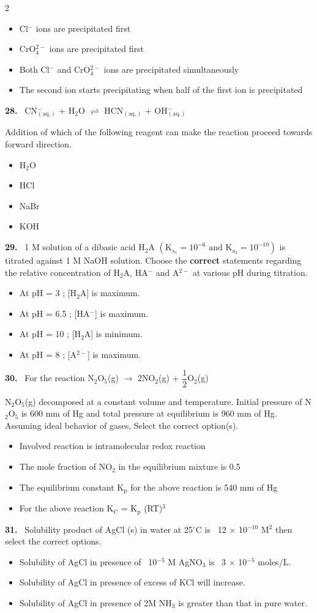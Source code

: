 \documentclass[10pt]{extarticle}
\newcommand{\qn}[1]{\par\smallskip\noindent\textbf{#1.}~}
\newenvironment{qoptions}{\begin{itemize}[leftmargin=1.8em,itemsep=1pt,topsep=2pt,label={}]}{\end{itemize}}
\newcommand{\opt}[2]{\item[(#1)] #2}
\begin{document}
\begin{multicols}{2}
\begin{qoptions}
\opt{A}{Cl$^-$ ions are precipitated first}
\opt{B}{CrO$_4^{2-}$ ions are precipitated first}
\opt{C}{Both Cl$^-$ and CrO$_4^{2-}$ ions are precipitated simultaneously}
\opt{D}{The second ion starts precipitating when half of the first ion is precipitated}
\end{qoptions}
\qn{28} CN$^-_{\mathrm{(aq.)}}$ + H$_2$O $\rightleftharpoons$ HCN$_{\mathrm{(aq.)}}$ + OH$^-_{\mathrm{(aq.)}}$\par
Addition of which of the following reagent can make the reaction proceed towards forward direction.
\begin{qoptions}
\opt{A}{H$_2$O}
\opt{B}{HCl}
\opt{C}{NaBr}
\opt{D}{KOH}
\end{qoptions}
\qn{29} 1 M solution of a dibasic acid H$_2$A $\left(\mathrm K_{\mathrm a_1}=10^{-6}\text{ and }\mathrm K_{\mathrm a_2}=10^{-10}\right)$ is titrated against 1 M NaOH solution. Choose the \textbf{correct} statements regarding the relative concentration of H$_2$A, HA$^-$ and A$^{2-}$ at various pH during titration.
\begin{qoptions}
\opt{A}{At pH = 3 ; [H$_2$A] is maximum.}
\opt{B}{At pH = 6.5 ; [HA$^-$] is maximum.}
\opt{C}{At pH = 10 ; [H$_2$A] is minimum.}
\opt{D}{At pH = 8 ; [A$^{2-}$] is maximum.}
\end{qoptions}
\qn{30} For the reaction N$_2$O$_5$(g) $\longrightarrow$ 2NO$_2$(g) + $\dfrac12$O$_2$(g)\par
N$_2$O$_5$(g) decomposed at a constant volume and temperature. Initial pressure of N$_2$O$_5$ is 600 mm of Hg and total pressure at equilibrium is 960 mm of Hg. Assuming ideal behavior of gases, Select the correct option(s).
\begin{qoptions}
\opt{A}{Involved reaction is intramolecular redox reaction}
\opt{B}{The mole fraction of NO$_2$ in the equilibrium mixture is 0.5}
\opt{C}{The equilibrium constant K$_\mathrm p$ for the above reaction is 540 mm of Hg}
\opt{D}{For the above reaction K$_\mathrm C$ = K$_\mathrm p$ (RT)$^3$}
\end{qoptions}
\qn{31} Solubility product of AgCl (s) in water at 25$^\circ$C is \ 12 $\times$ 10$^{-10}$ M$^2$ then select the correct options.
\begin{qoptions}
\opt{A}{Solubility of AgCl in presence of \ 10$^{-5}$ M AgNO$_3$ is \ 3 $\times$ 10$^{-5}$ moles/L.}
\opt{B}{Solubility of AgCl in presence of excess of KCl will increase.}
\opt{C}{Solubility of AgCl in presence of 2M NH$_3$ is greater than that in pure water.}

\end{qoptions}
\end{multicols}
\end{document}
